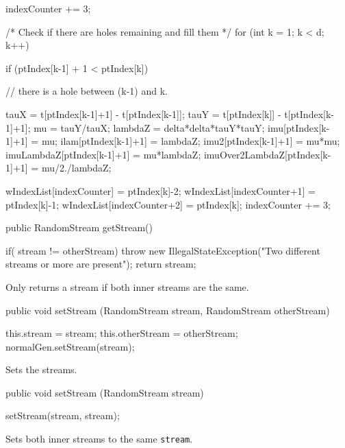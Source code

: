 \begin{code}
\begin{hide}
{{{{                    indexCounter += 3;
                }
            }

            /* Check if there are holes remaining and fill them */
            for (int k = 1; k < d; k++) {
                if (ptIndex[k-1] + 1 < ptIndex[k]) {
                // there is a hole between (k-1) and k.

                    tauX      = t[ptIndex[k-1]+1] - t[ptIndex[k-1]];
                    tauY      = t[ptIndex[k]]     - t[ptIndex[k-1]+1];
                    mu        = tauY/tauX;
                    lambdaZ   = delta*delta*tauY*tauY;
                    imu[ptIndex[k-1]+1]    = mu;
                    ilam[ptIndex[k-1]+1]   = lambdaZ;
                    imu2[ptIndex[k-1]+1]   = mu*mu;
                    imuLambdaZ[ptIndex[k-1]+1]      = mu*lambdaZ;
                    imuOver2LambdaZ[ptIndex[k-1]+1] = mu/2./lambdaZ;

                    wIndexList[indexCounter]   = ptIndex[k]-2;
                    wIndexList[indexCounter+1] = ptIndex[k]-1;
                    wIndexList[indexCounter+2] = ptIndex[k];
                    indexCounter += 3;
                }
            }
        }
    }\end{hide}

   public RandomStream getStream() \begin{hide} {
        if( stream != otherStream)
            throw new IllegalStateException("Two different streams or more are present");
        return stream;
    }\end{hide}
\end{code}
\begin{tabb} Only returns a stream if both inner streams are the same.
\end{tabb}
\begin{code}

   public void setStream (RandomStream stream, RandomStream otherStream) \begin{hide} {
        this.stream = stream;
        this.otherStream = otherStream;
        normalGen.setStream(stream);
    }\end{hide}
\end{code}
\begin{tabb} Sets the streams.
\end{tabb}
\begin{code}

   public void setStream (RandomStream stream) \begin{hide} {
        setStream(stream, stream);
    }\end{hide}
\end{code}
\begin{tabb} Sets both inner streams to the same \texttt{stream}.
\end{tabb}
\begin{code}
\begin{hide}
}
\end{hide}
\end{code}
